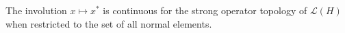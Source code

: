 The involution $x \mapsto x^*$ is continuous for the strong operator topology of $\mathcal{L}(H)$ when restricted to the set of all normal elements.
